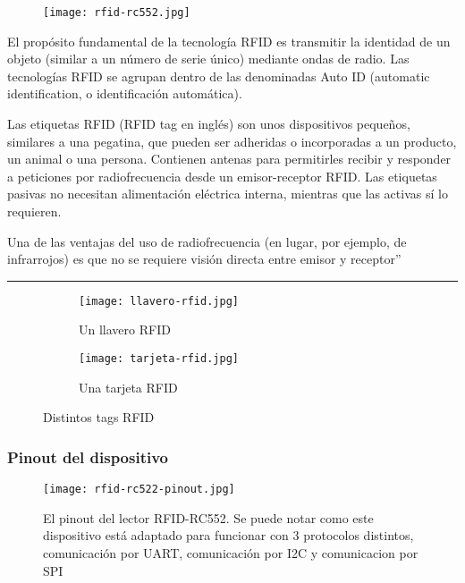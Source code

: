 \documentclass[../informe_krapp.tex]{subfiles}
\begin{document}
\begin{wrapfigure}{r}{0in}
	\centering
	\texttt{[image: rfid-rc552.jpg]}
\end{wrapfigure}

El propósito fundamental de la tecnología RFID es transmitir la identidad de
un objeto (similar a un número de serie único) mediante ondas de radio. Las tecnologías
RFID se agrupan dentro de las denominadas Auto ID (automatic identification,
o identificación automática).

Las etiquetas RFID (RFID tag en inglés) son unos dispositivos pequeños, similares
a una pegatina, que pueden ser adheridas o incorporadas a un producto, un animal
o una persona. Contienen antenas para permitirles recibir y responder a peticiones
por radiofrecuencia desde un emisor-receptor RFID. Las etiquetas pasivas no necesitan
alimentación eléctrica interna, mientras que las activas sí lo requieren.

Una de las ventajas del uso de radiofrecuencia (en lugar, por ejemplo, de infrarrojos)
es que no se requiere visión directa entre emisor y receptor''

\begin{center}
	\rule{0.8\textwidth}{0.3pt}
\end{center}

\begin{figure}[H]
	\centering
	\begin{subfigure}{0.4\textwidth}
		\texttt{[image: llavero-rfid.jpg]}
		\caption{Un llavero RFID}
	\end{subfigure}
	\begin{subfigure}{0.4\textwidth}
		\texttt{[image: tarjeta-rfid.jpg]}
		\caption{Una tarjeta RFID}
	\end{subfigure}
	\caption{Distintos tags RFID}
\end{figure}

\clearpage
\subsubsection{Pinout del dispositivo}

\begin{wrapfigure}{r}{0in}
	\centering
	\texttt{[image: rfid-rc522-pinout.jpg]}
	\caption{El pinout del lector RFID-RC552.
		Se puede notar como este dispositivo está adaptado para funcionar con 3 protocolos
		distintos, comunicación por UART, comunicación por I2C y comunicacion por SPI}
\end{wrapfigure}
\end{document}
